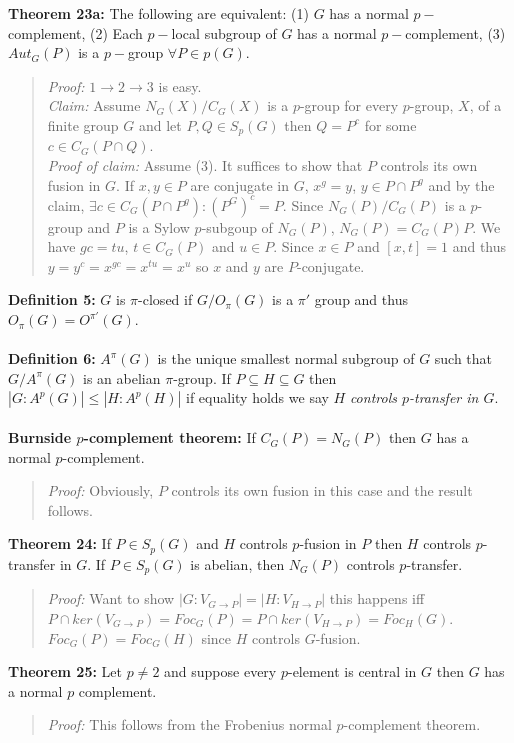 {\bf Theorem 23a:}  The following are equivalent:
(1) $G$ has a normal $p-$complement, 
(2) Each $p-$local subgroup of $G$ has a normal $p-$complement,
(3) $Aut_G(P)$ is a $p-$group $\forall P \in p(G)$.
\begin{quote}
\emph{Proof:}  
$1 \rightarrow 2 \rightarrow 3$ is easy.
\\
\emph{Claim:} Assume $N_G(X)/C_G(X)$ is a $p$-group for every $p$-group, $X$, of a finite
group $G$ and let $P, Q \in S_p(G)$ then $Q=P^c$ for some $c \in C_G(P \cap Q )$.
\\
\emph{Proof of claim:}
Assume (3).  It suffices to show that $P$ controls its own fusion in $G$.  If
$x,y \in P$ are conjugate in $G$, $x^g=y$, $y \in P \cap P^g$ and by the claim,
$\exists c \in C_G(P \cap P^g): (P^G)^c=P$.  Since $N_G(P)/C_G(P)$ is a $p$-group
and $P$ is a Sylow $p$-subgoup of $N_G(P)$,  $N_G(P)= C_G(P)P$.  We have
$gc=tu$, $t \in C_G(P)$ and $u \in P$.  Since $x \in P$ and $[x,t]=1$ and thus
$y=y^c=x^{gc}=x^{tu}=x^u$ so $x$ and $y$ are $P$-conjugate.
\end{quote}
{\bf Definition 5:} $G$ is $\pi$-closed if $G/O_{\pi}(G)$ is a $\pi'$ group and thus
$O_{\pi}(G)=O^{\pi'}(G)$.\\
\\
{\bf Definition 6:} $A^{\pi}(G)$ is the unique smallest normal subgroup of $G$ such that
$G/A^{\pi}(G)$ is an abelian $\pi$-group.  If $P \subseteq H \subseteq G$ then
$ |G:A^p(G)| \le |H:A^p(H)|$ if equality holds we say $H$ \emph {controls $p$-transfer in $G$}.
\\
\\
{\bf Burnside $p$-complement theorem:}  If $C_G(P)= N_G(P)$ then $G$ has a normal $p$-complement.
\begin{quote}
\emph{Proof:}  Obviously, $P$ controls its own fusion in this case and the result follows.
\end{quote}
{\bf Theorem 24:}  If $P \in S_p(G)$ and $H$ controls $p$-fusion in $P$ then $H$ controls $p$-transfer
in $G$.  If $P \in S_p(G)$ is abelian, then $N_G(P)$ controls $p$-transfer.  
\begin{quote}
\emph{Proof:}  
Want to show $|G:V_{G \rightarrow P}| = |H:V_{H \rightarrow P}|$ this happens iff
$P \cap ker(V_{G \rightarrow P}) = Foc_G(P) = P \cap ker(V_{H \rightarrow P}) = Foc_H(G)$.
$Foc_G(P) = Foc_G(H)$ since $H$ controls $G$-fusion.
\end{quote}
{\bf Theorem 25:} 
Let $p \ne 2$ and suppose every $p$-element is central in
$G$ then $G$ has a normal $p$ complement.
\begin{quote}
\emph{Proof:}  
This follows from the Frobenius normal $p$-complement theorem.
\end{quote}
